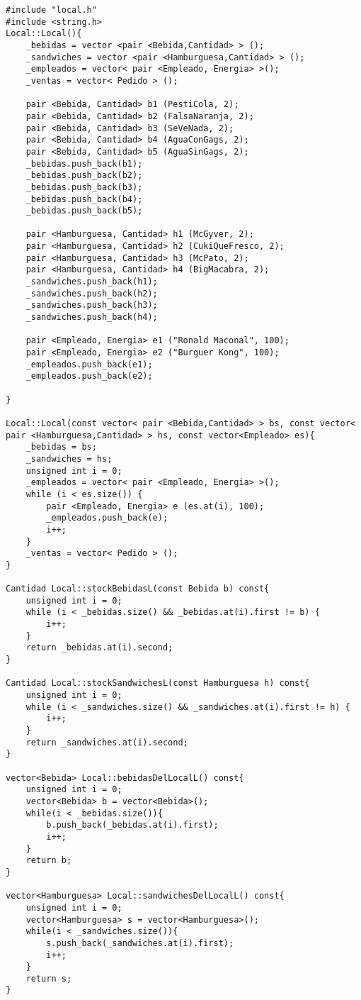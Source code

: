 \begin{lstlisting}
#include "local.h"
#include <string.h>
Local::Local(){
	_bebidas = vector <pair <Bebida,Cantidad> > ();
	_sandwiches = vector <pair <Hamburguesa,Cantidad> > ();
	_empleados = vector< pair <Empleado, Energia> >();
	_ventas = vector< Pedido > ();

	pair <Bebida, Cantidad> b1 (PestiCola, 2);
	pair <Bebida, Cantidad> b2 (FalsaNaranja, 2);
	pair <Bebida, Cantidad> b3 (SeVeNada, 2);
	pair <Bebida, Cantidad> b4 (AguaConGags, 2);
	pair <Bebida, Cantidad> b5 (AguaSinGags, 2);
	_bebidas.push_back(b1);
	_bebidas.push_back(b2);
	_bebidas.push_back(b3);
	_bebidas.push_back(b4);
	_bebidas.push_back(b5);

	pair <Hamburguesa, Cantidad> h1 (McGyver, 2);
	pair <Hamburguesa, Cantidad> h2 (CukiQueFresco, 2);
	pair <Hamburguesa, Cantidad> h3 (McPato, 2);
	pair <Hamburguesa, Cantidad> h4 (BigMacabra, 2);
	_sandwiches.push_back(h1);
	_sandwiches.push_back(h2);
	_sandwiches.push_back(h3);
	_sandwiches.push_back(h4);

	pair <Empleado, Energia> e1 ("Ronald Maconal", 100);
	pair <Empleado, Energia> e2 ("Burguer Kong", 100);
	_empleados.push_back(e1);
	_empleados.push_back(e2);

}

Local::Local(const vector< pair <Bebida,Cantidad> > bs, const vector< pair <Hamburguesa,Cantidad> > hs, const vector<Empleado> es){
	_bebidas = bs;
	_sandwiches = hs;
	unsigned int i = 0;
	_empleados = vector< pair <Empleado, Energia> >();
	while (i < es.size()) {
		pair <Empleado, Energia> e (es.at(i), 100);
		_empleados.push_back(e);
		i++;
	}
	_ventas = vector< Pedido > ();
}

Cantidad Local::stockBebidasL(const Bebida b) const{
	unsigned int i = 0;
	while (i < _bebidas.size() && _bebidas.at(i).first != b) {
		i++;
	}
	return _bebidas.at(i).second;
}

Cantidad Local::stockSandwichesL(const Hamburguesa h) const{
	unsigned int i = 0;
	while (i < _sandwiches.size() && _sandwiches.at(i).first != h) {
		i++;
	}
	return _sandwiches.at(i).second;
}

vector<Bebida> Local::bebidasDelLocalL() const{
	unsigned int i = 0;
	vector<Bebida> b = vector<Bebida>();
	while(i < _bebidas.size()){
		b.push_back(_bebidas.at(i).first);
		i++;
	}
	return b;
}

vector<Hamburguesa> Local::sandwichesDelLocalL() const{
	unsigned int i = 0;
	vector<Hamburguesa> s = vector<Hamburguesa>();
	while(i < _sandwiches.size()){
		s.push_back(_sandwiches.at(i).first);
		i++;
	}
	return s;
}



\end{lstlisting}
